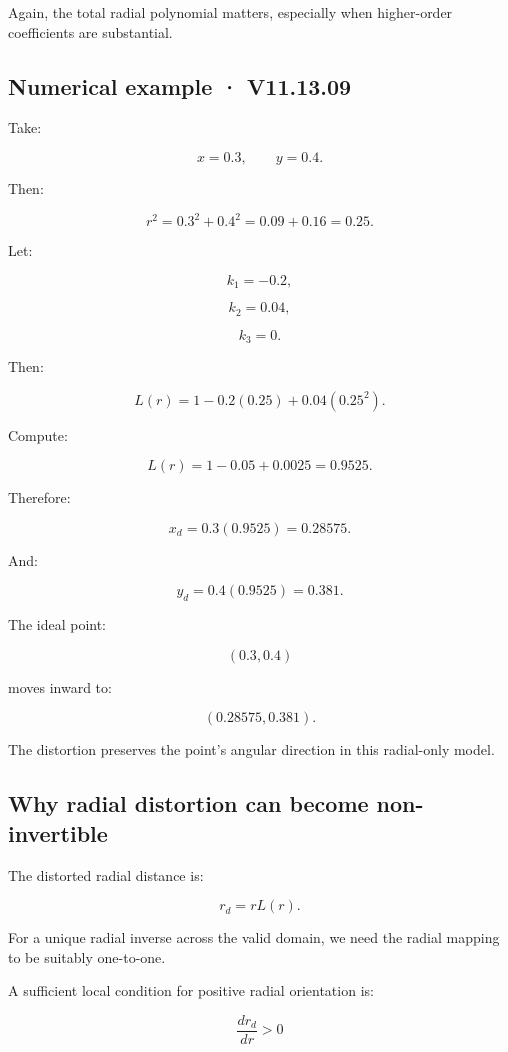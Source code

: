 Again, the total radial polynomial matters, especially when higher-order coefficients are substantial.

\subsection{Numerical example · V11.13.09}\label{02-foundations-ii-ch035-numerical-example-v11.13.09}

Take:

\[
 x=0.3,\qquad y=0.4.
\]

Then:

\[
 r^2=0.3^2+0.4^2 =0.09+0.16 =\boxed{0.25}.
\]

Let:

\[
 k_1=-0.2,
\]

\[
 k_2=0.04,
\]

\[
 k_3=0.
\]

Then:

\[
 L(r)=1-0.2(0.25)+0.04(0.25^2).
\]

Compute:

\[
 L(r)=1-0.05+0.0025 =\boxed{0.9525}.
\]

Therefore:

\[
 x_d=0.3(0.9525) =\boxed{0.28575}.
\]

And:

\[
 y_d=0.4(0.9525) =\boxed{0.381}.
\]

The ideal point:

\[
 (0.3,0.4)
\]

moves inward to:

\[
 \boxed{(0.28575,0.381)}.
\]

The distortion preserves the point's angular direction in this radial-only model.

\subsection{Why radial distortion can become non-invertible}\label{02-foundations-ii-ch035-why-radial-distortion-can-become-non-invertible}

The distorted radial distance is:

\[
 \boxed{ r_d=rL(r) }.
\]

For a unique radial inverse across the valid domain, we need the radial mapping to be suitably one-to-one.

A sufficient local condition for positive radial orientation is:

\[
 \boxed{ \frac{dr_d}{dr}>0 }
\]

